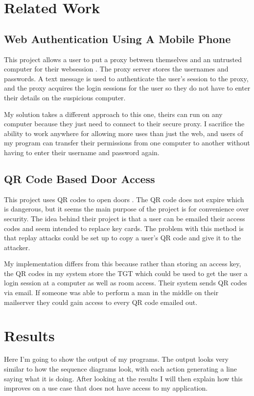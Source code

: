 \documentclass[]{report}   %
\begin{document}
\section{Related Work}
\subsection {Web Authentication Using A Mobile Phone}
This project allows a user to put a proxy between themselves and an untrusted computer for their websession \cite{Wu04secureweb}. The proxy server stores the usernames and passwords. A text message is used to authenticate the user's session to the proxy, and the proxy acquires the login sessions for the user so they do not have to enter their details on the suspicious computer.

My solution takes a different approach to this one, theirs can run on any computer because they just need to connect to their secure proxy. I sacrifice the ability to work anywhere for allowing more uses than just the web, and users of my program can transfer their permissions from one computer to another without having to enter their username and password again. 

\subsection{QR Code Based Door Access}
This project uses QR codes to open doors \cite{QRRelated}. The QR code does not expire which is dangerous, but it seems the main purpose of the project is for convenience over security. The idea behind their project is that a user can be emailed their access codes and seem intended to replace key cards. The problem with this method is that replay attacks could be set up to copy a user's QR code and give it to the attacker.

My implementation differs from this because rather than storing an access key, the QR codes in my system store the TGT which could be used to get the user a login session at a computer as well as room access. Their system sends QR codes via email. If someone was able to perform a man in the middle on their mailserver they could gain access to every QR code emailed out.


\section{Results}
Here I'm going to show the output of my programs. The output looks very similar to how the sequence diagrams look, with each action generating a line saying what it is doing. After looking at the results I will then explain how this improves on a use case that does not have access to my application.
\end{document}
